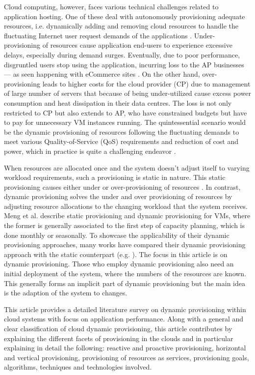 \documentclass[10pt,journal,cspaper,compsoc]{IEEEtran}
\begin{document}
Cloud computing, however, faces various technical challenges related to application hosting. One of these deal with autonomously provisioning adequate resources, i.e. dynamically adding and removing cloud resources to handle the fluctuating Internet user request demands of the applications \cite{zhang2010cloud13}. Under-provisioning of resources cause application end-users to experience excessive delays, especially during demand surges. Eventually, due to poor performance, disgruntled users stop using the application, incurring loss to the AP businesses --- as seen happening with eCommerce sites \cite{ForresterWhitepaper34}. On the other hand, over-provisioning leads to higher costs for the cloud provider (CP) due to management of large number of servers that because of being under-utilized cause excess power consumption and heat dissipation in their data centres. The loss is not only restricted to CP but also extends to AP, who have constrained budgets but have to pay for unnecessary VM instances running. The quintessential scenario would be the dynamic provisioning of resources following the fluctuating demands to meet various Quality-of-Service (QoS) requirements and reduction of cost and power, which in practice is quite a challenging endeavor \cite{zhang2010cloud13}.

When resources are allocated once and the system doesn't adjust itself to varying workload requirements, such a provisioning is static in nature. This static provisioning causes either under or over-provisioning of resources \cite{2012_EmpiricalPredicationModels}. In contrast, dynamic provisioning solves the under and over provisioning of resources by adjusting resource allocations to the changing workload that the system receives. Meng et al. \cite{2010_EfficientResourceProvisioning} describe static provisioning and dynamic provisioning for VMs, where the former is generally associated to the first step of capacity planning, which is done monthly or seasonally. To showcase the applicability of their dynamic provisioning approaches, many works have compared their dynamic provisioning approach with the static counterpart (e.g. \cite{2011_DynamicResProvMultiplayerGames,calheirosvirtual3, iqbal2010sla6}). The focus in this article is on dynamic provisioning. Those who employ dynamic provisioning also need an initial deployment of the system, where the numbers of the resources are known. This generally forms an implicit part of dynamic provisioning but the main idea is the adaption of the system to changes.

This article provides a detailed literature survey on dynamic provisioning within cloud systems with focus on application performance. Along with a general and clear classification of cloud dynamic provisioning, this article contributes by explaining the different facets of provisioning in the clouds and in particular explaining in detail the following: reactive and proactive provisioning, horizontal and vertical provisioning, provisioning of resources as services, provisioning goals, algorithms, techniques and technologies involved. 
\end{document}
